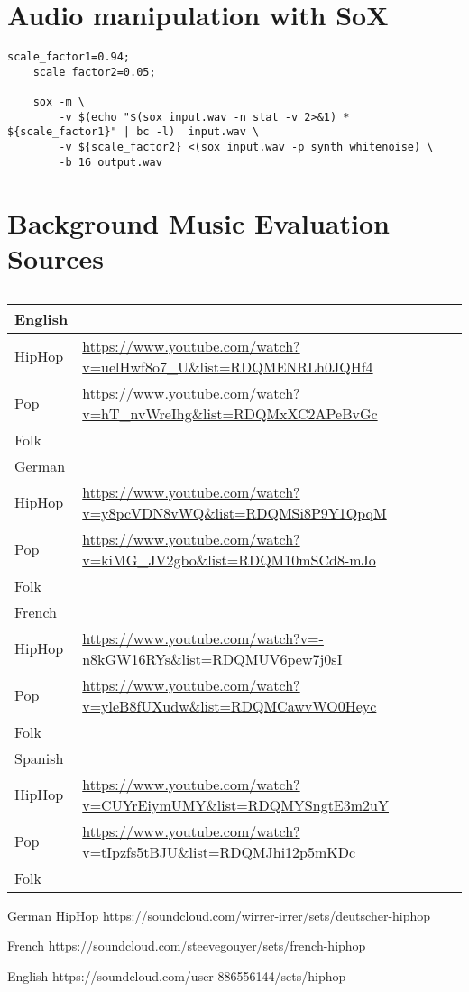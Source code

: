 \begin{appendices}
\section{Audio manipulation with SoX}
\label{sec:appendix_a}

        \begin{lstlisting}[caption=Adding white noise to an audio file]
    scale_factor1=0.94; 
    scale_factor2=0.05;
     
    sox -m \
        -v $(echo "$(sox input.wav -n stat -v 2>&1) * ${scale_factor1}" | bc -l)  input.wav \
        -v ${scale_factor2} <(sox input.wav -p synth whitenoise) \
        -b 16 output.wav
   \end{lstlisting}
   
\section{Background Music Evaluation Sources}

	\begin{table}[h!]
	\centering
	\begin{tabularx}{\textwidth}{ll}
\toprule
English  & \\ \midrule
HipHop  & \url{https://www.youtube.com/watch?v=uelHwf8o7_U&list=RDQMENRLh0JQHf4} \\ 
Pop     & \url{https://www.youtube.com/watch?v=hT_nvWreIhg&list=RDQMxXC2APeBvGc} \\   
Folk    & \url{} \\
\toprule
German  & \\ \midrule
HipHop  & \url{https://www.youtube.com/watch?v=y8pcVDN8vWQ&list=RDQMSi8P9Y1QpqM} \\ 
Pop     & \url{https://www.youtube.com/watch?v=kiMG_JV2gbo&list=RDQM10mSCd8-mJo} \\   
Folk    & \url{} \\
\toprule
French  & \\ \midrule
HipHop  & \url{https://www.youtube.com/watch?v=-n8kGW16RYs&list=RDQMUV6pew7j0sI} \\ 
Pop     & \url{https://www.youtube.com/watch?v=yleB8fUXudw&list=RDQMCawvWO0Heyc} \\   
Folk    & \url{} \\
\toprule
Spanish  & \\ \midrule
HipHop  & \url{https://www.youtube.com/watch?v=CUYrEiymUMY&list=RDQMYSngtE3m2uY} \\ 
Pop     & \url{https://www.youtube.com/watch?v=tIpzfs5tBJU&list=RDQMJhi12p5mKDc} \\   
Folk    & \url{} \\
 	\bottomrule
	\end{tabularx}
	\caption{}
	\label{tab:audio_sources}
	\end{table}
German
HipHop https://soundcloud.com/wirrer-irrer/sets/deutscher-hiphop

French
https://soundcloud.com/steevegouyer/sets/french-hiphop

English 
https://soundcloud.com/user-886556144/sets/hiphop
\end{appendices}
